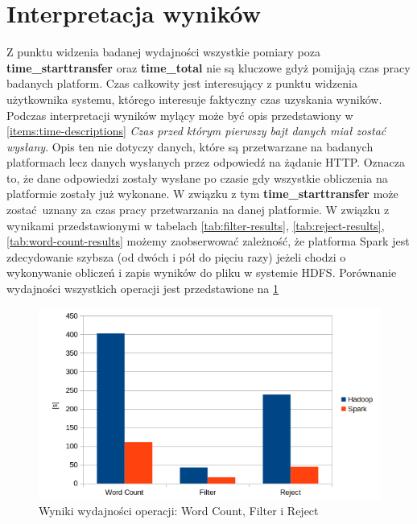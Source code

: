 \section{Interpretacja wyników}
Z punktu widzenia badanej wydajności wszystkie pomiary poza \textbf{time\_starttransfer} oraz \textbf{time\_total} nie są kluczowe gdyż pomijają czas pracy badanych platform. Czas całkowity jest interesujący z punktu widzenia użytkownika systemu, którego interesuje faktyczny czas uzyskania wyników. Podczas interpretacji wyników mylący może być opis przedstawiony w \ref{items:time-descriptions} \textit{Czas przed którym pierwszy bajt danych miał zostać wysłany}. Opis ten nie dotyczy danych, które są przetwarzane na badanych platformach lecz danych wysłanych przez odpowiedź na żądanie HTTP. Oznacza to, że dane odpowiedzi zostały wysłane po czasie gdy wszystkie obliczenia na platformie zostały już wykonane. W związku z tym \textbf{time\_starttransfer} może zostać uznany za czas pracy przetwarzania na danej platformie.
\newline W związku z wynikami przedstawionymi w tabelach \ref{tab:filter-results}, \ref{tab:reject-results}, \ref{tab:word-count-results} możemy zaobserwować zależność, że platforma Spark jest zdecydowanie szybsza (od dwóch i pół do pięciu razy) jeżeli chodzi o wykonywanie obliczeń i zapis wyników do pliku w systemie HDFS. Porównanie wydajności wszystkich operacji jest przedstawione na \ref{fig:results-comparison-bar}
\begin{figure}[!htb]
	\centering
	\includegraphics[scale=0.4]{results-comparison-bar.png}
	\caption{Wyniki wydajności operacji: Word Count, Filter i Reject}
	\label{fig:results-comparison-bar}
\end{figure}   
